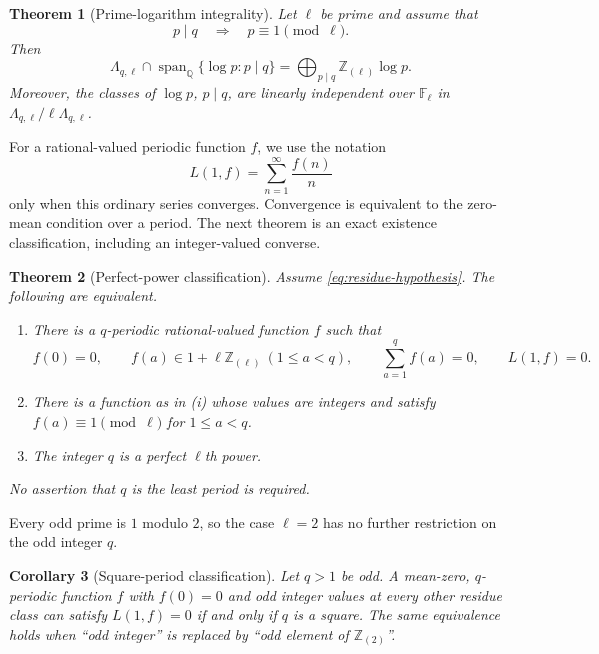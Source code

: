 \documentclass[11pt,a4paper]{article}
\newtheorem{theorem}{Theorem}[section]
\newtheorem{corollary}[theorem]{Corollary}
\theoremstyle{definition}
\theoremstyle{remark}
\newcommand{\Q}{\mathbb Q}
\newcommand{\Z}{\mathbb Z}
\newcommand{\F}{\mathbb F}
\newcommand{\Zloc}{\Z_{(\ell)}}
\DeclareMathOperator{\spanop}{span}
\begin{document}
\begin{theorem}[Prime-logarithm integrality]\label{thm:purity-main}
Let $\ell$ be prime and assume that
\begin{equation}\label{eq:residue-hypothesis}
 p\mid q\quad\Longrightarrow\quad p\equiv1\pmod\ell.
\end{equation}
Then
\begin{equation}\label{eq:purity-main}
 \Lambda_{q,\ell}\cap
 \spanop_{\Q}\{\log p:p\mid q\}
 =\bigoplus_{p\mid q}\Zloc\log p.
\end{equation}
Moreover, the classes of $\log p$, $p\mid q$, are linearly independent
over $\F_\ell$ in $\Lambda_{q,\ell}/\ell\Lambda_{q,\ell}$.
\end{theorem}

For a rational-valued periodic function $f$, we use the notation
\[
 L(1,f)=\sum_{n=1}^{\infty}\frac{f(n)}n
\]
only when this ordinary series converges. Convergence is equivalent to
the zero-mean condition over a period. The next theorem is an exact
existence classification, including an integer-valued converse.

\begin{theorem}[Perfect-power classification]\label{thm:classification}
Assume \eqref{eq:residue-hypothesis}. The following are equivalent.
\begin{enumerate}[label=\textup{(\roman*)}]
\item There is a $q$-periodic rational-valued function $f$ such that
\begin{equation}\label{eq:function-conditions}
 f(0)=0,\qquad
 f(a)\in1+\ell\Zloc\ (1\le a<q),\qquad
 \sum_{a=1}^{q}f(a)=0,\qquad L(1,f)=0.
\end{equation}
\item There is a function as in \textup{(i)} whose values are integers
and satisfy $f(a)\equiv1\pmod\ell$ for $1\le a<q$.
\item The integer $q$ is a perfect $\ell$th power.
\end{enumerate}
No assertion that $q$ is the least period is required.
\end{theorem}

Every odd prime is $1$ modulo $2$, so the case $\ell=2$ has no further
restriction on the odd integer $q$.

\begin{corollary}[Square-period classification]\label{cor:squares}
Let $q>1$ be odd. A mean-zero, $q$-periodic function $f$ with $f(0)=0$
and odd integer values at every other residue class can satisfy
$L(1,f)=0$ if and only if $q$ is a square. The same equivalence holds
when ``odd integer'' is replaced by ``odd element of $\Z_{(2)}$''.
\end{corollary}
\end{document}
